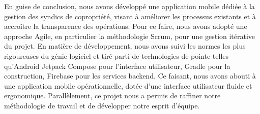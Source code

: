En guise de conclusion, nous avons développé une application mobile dédiée à la gestion des syndics de copropriété, visant à améliorer les processus existants et à accroître la transparence des opérations. 
Pour ce faire, nous avons adopté une approche Agile, en particulier la méthodologie Scrum, pour une gestion itérative du projet.
 En matière de développement, nous avons suivi les normes les plus rigoureuses du génie logiciel et tiré parti de technologies de pointe telles qu'Android Jetpack Compose pour l'interface utilisateur, Gradle pour la construction, Firebase pour les services backend.
Ce faisant, nous avons abouti à une application mobile opérationnelle, dotée d'une interface utilisateur fluide et ergonomique.
Parallèlement, ce projet nous a permis de raffiner notre méthodologie de travail et de développer notre esprit d'équipe.